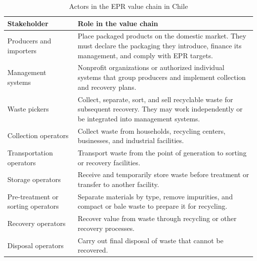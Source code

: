 \documentclass[review,10pt]{elsarticle}
\begin{document}
\begin{longtable}{|L{4.5cm}|L{10cm}|}
\caption{Actors in the EPR value chain in Chile}
\label{tab:actores_rep_chile}\\
\hline
\textbf{Stakeholder} & \textbf{Role in the value chain} \\
\hline
\endfirsthead
\hline
{} Producers and importers & Place packaged products on the domestic market. They must declare the packaging they introduce, finance its management, and comply with EPR targets. \\
\hline
{} Management systems & Nonprofit organizations or authorized individual systems that group producers and implement collection and recovery plans. \\
\hline
{} Waste pickers & Collect, separate, sort, and sell recyclable waste for subsequent recovery. They may work independently or be integrated into management systems.\\
\hline
{} Collection operators & Collect waste from households, recycling centers, businesses, and industrial facilities. \\
\hline
{} Transportation operators & Transport waste from the point of generation to sorting or recovery facilities. \\
\hline
{} Storage operators & Receive and temporarily store waste before treatment or transfer to another facility. \\
\hline
{} Pre-treatment or sorting operators & Separate materials by type, remove impurities, and compact or bale waste to prepare it for recycling. \\
\hline
{} Recovery operators & Recover value from waste through recycling or other recovery processes.\\
\hline
{} Disposal operators & Carry out final disposal of waste that cannot be recovered. \\

\end{longtable}
\end{document}
